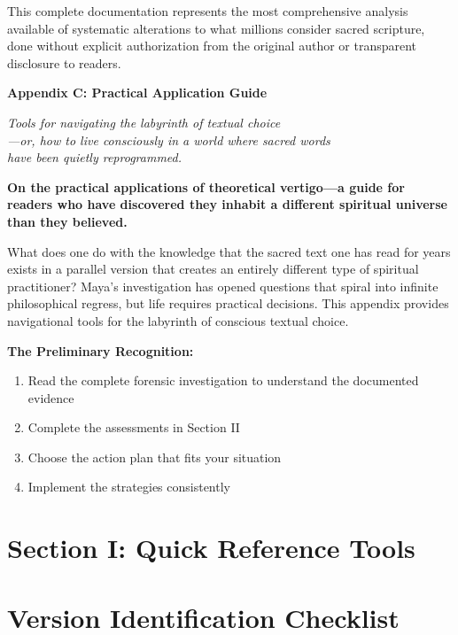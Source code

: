 \documentclass[11pt,twoside]{book}
\makeatletter
\def\cleardoublepage{\clearpage\if@twoside \ifodd\c@page\else\hbox{}\thispagestyle{empty}\newpage\if@twocolumn\hbox{}\newpage\fi\fi\fi}
\makeatother
\begin{document}
This complete documentation represents the most comprehensive analysis available of systematic alterations to what millions consider sacred scripture, done without explicit authorization from the original author or transparent disclosure to readers.

\clearpage
\thispagestyle{empty}
\mbox{}
\newpage
\pagestyle{sectionopening}
\thispagestyle{sectionopening}
\markboth{}{}
\markright{}
\cleardoublepage
\vspace*{0.25\textheight}
\begin{center}
{\Huge\bfseries Appendix C: Practical Application Guide}
\end{center}
\newpage

{\centering\itshape Tools for navigating the labyrinth of textual choice\\—or, how to live consciously in a world where sacred words\\have been quietly reprogrammed.\par}
\vspace{0.3cm}

\normalfont\justifying
\textbf{On the practical applications of theoretical vertigo—a guide for readers who have discovered they inhabit a different spiritual universe than they believed.}

What does one do with the knowledge that the sacred text one has read for years exists in a parallel version that creates an entirely different type of spiritual practitioner? Maya's investigation has opened questions that spiral into infinite philosophical regress, but life requires practical decisions. This appendix provides navigational tools for the labyrinth of conscious textual choice.

\textbf{\textbf{The Preliminary Recognition:}}
\begin{enumerate}
\item Read the complete forensic investigation to understand the documented evidence
\item Complete the assessments in Section II
\item Choose the action plan that fits your situation
\item Implement the strategies consistently
\end{enumerate}
\section*{Section I: Quick Reference Tools}
\label{sec:org026c4ac}

\section*{Version Identification Checklist}
\label{sec:orgaef16da}
\end{document}
